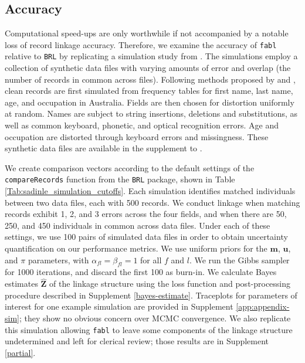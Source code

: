 \documentclass[ba]{imsart}
\begin{document}
	
	\hypertarget{accuracy}{%
		\subsection{Accuracy}\label{accuracy}}
	
	Computational speed-ups are only worthwhile if not accompanied by a notable loss of record linkage accuracy. Therefore, we examine the accuracy of \texttt{fabl} relative to \texttt{BRL} by replicating a simulation study from \cite{sadinle_bayesian_2017}. The simulations employ a collection of synthetic data files with varying amounts of error and overlap (the number of records in common across files). Following methods proposed by \cite{christen_pudjijono2009} and \cite{christen_vatsalan2013}, clean records are first simulated from frequency tables for first name, last name, age, and occupation in Australia. Fields are then chosen for distortion uniformly at random. Names are subject to string insertions, deletions and substitutions, as well as common keyboard, phonetic, and optical recognition errors. Age and occupation are distorted through keyboard errors and missingness. These synthetic data files are available in the supplement to \cite{sadinle_bayesian_2017}.
	
	We create comparison vectors according to the default settings of the \texttt{compareRecords} function from the \texttt{BRL} package, shown in Table \ref{Tab:sadinle_simulation_cutoffs}. Each simulation identifies matched individuals between two data files, each with 500 records. We conduct linkage when matching records exhibit 1, 2, and 3 errors across the four fields, and when there are 50, 250, and 450 individuals in common across data files. Under each of these settings, we use 100 pairs of simulated data files in order to obtain uncertainty quantification on our performance metrics. We use uniform priors for the $\bm{m}$, $\bm{u}$, and $\pi$ parameters, with $\alpha_{fl} = \beta_{fl} = 1$ for all $f$ and $l$. We run the Gibbs sampler for 1000 iterations, and discard the first 100 as burn-in. We calculate Bayes estimates $\hat{\bm{Z}}$ of the linkage structure using the  loss function and post-processing procedure described in Supplement \ref{bayes-estimate}. Traceplots for parameters of interest for one example simulation are provided in Supplement \ref{app:appendix-sim}; they show no obvious concern over MCMC convergence. We also replicate this simulation allowing \texttt{fabl} to leave some components of the linkage structure undetermined and left for clerical review; those results are in Supplement \ref{partial}.
	
\end{document}
